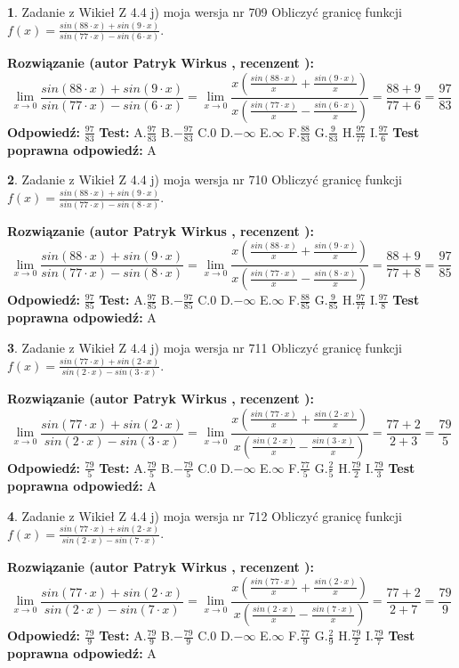 \documentclass[12pt, a4paper]{article}
\theoremstyle{definition} %
\newtheorem{zad}{}
\newcommand{\zadStart}[1]{\begin{zad}#1\newline}
\newcommand{\zadStop}{\end{zad}}
\newcommand{\rozwStart}[2]{\noindent \textbf{Rozwiązanie (autor #1 , recenzent #2): }\newline}
\newcommand{\rozwStop}{\newline}
\newcommand{\odpStart}{\noindent \textbf{Odpowiedź:}\newline}
\newcommand{\odpStop}{\newline}
\newcommand{\testStart}{\noindent \textbf{Test:}\newline}
\newcommand{\testStop}{\newline}
\newcommand{\kluczStart}{\noindent \textbf{Test poprawna odpowiedź:}\newline}
\newcommand{\kluczStop}{\newline}
\begin{document}
\zadStart{Zadanie z Wikieł Z 4.4 j) moja wersja nr 709}
Obliczyć granicę funkcji $f(x)=\frac{sin(88\cdot x) +sin(9\cdot x)}{sin(77\cdot x) -sin(6\cdot x)}$.
\zadStop
\rozwStart{Patryk Wirkus}{}
$$\lim\limits_{x\to 0}\frac{sin(88\cdot x) +sin(9\cdot x)}{sin(77\cdot x) -sin(6\cdot x)}=\lim\limits_{x\to 0}\frac{x(\frac{sin(88\cdot x)}{x}+\frac{sin(9\cdot x)}{x})}{x(\frac{sin(77\cdot x)}{x}-\frac{sin(6\cdot x)}{x})}=\frac{88+9}{77+6} = \frac{97}{83}$$
\rozwStop
\odpStart
$\frac{97}{83}$
\odpStop
\testStart
A.$\frac{97}{83}$
B.$-\frac{97}{83}$
C.$0$
D.$-\infty$
E.$\infty$
F.$\frac{88}{83}$
G.$\frac{9}{83}$
H.$\frac{97}{77}$
I.$\frac{97}{6}$
\testStop
\kluczStart
A
\kluczStop



\zadStart{Zadanie z Wikieł Z 4.4 j) moja wersja nr 710}
Obliczyć granicę funkcji $f(x)=\frac{sin(88\cdot x) +sin(9\cdot x)}{sin(77\cdot x) -sin(8\cdot x)}$.
\zadStop
\rozwStart{Patryk Wirkus}{}
$$\lim\limits_{x\to 0}\frac{sin(88\cdot x) +sin(9\cdot x)}{sin(77\cdot x) -sin(8\cdot x)}=\lim\limits_{x\to 0}\frac{x(\frac{sin(88\cdot x)}{x}+\frac{sin(9\cdot x)}{x})}{x(\frac{sin(77\cdot x)}{x}-\frac{sin(8\cdot x)}{x})}=\frac{88+9}{77+8} = \frac{97}{85}$$
\rozwStop
\odpStart
$\frac{97}{85}$
\odpStop
\testStart
A.$\frac{97}{85}$
B.$-\frac{97}{85}$
C.$0$
D.$-\infty$
E.$\infty$
F.$\frac{88}{85}$
G.$\frac{9}{85}$
H.$\frac{97}{77}$
I.$\frac{97}{8}$
\testStop
\kluczStart
A
\kluczStop



\zadStart{Zadanie z Wikieł Z 4.4 j) moja wersja nr 711}
Obliczyć granicę funkcji $f(x)=\frac{sin(77\cdot x) +sin(2\cdot x)}{sin(2\cdot x) -sin(3\cdot x)}$.
\zadStop
\rozwStart{Patryk Wirkus}{}
$$\lim\limits_{x\to 0}\frac{sin(77\cdot x) +sin(2\cdot x)}{sin(2\cdot x) -sin(3\cdot x)}=\lim\limits_{x\to 0}\frac{x(\frac{sin(77\cdot x)}{x}+\frac{sin(2\cdot x)}{x})}{x(\frac{sin(2\cdot x)}{x}-\frac{sin(3\cdot x)}{x})}=\frac{77+2}{2+3} = \frac{79}{5}$$
\rozwStop
\odpStart
$\frac{79}{5}$
\odpStop
\testStart
A.$\frac{79}{5}$
B.$-\frac{79}{5}$
C.$0$
D.$-\infty$
E.$\infty$
F.$\frac{77}{5}$
G.$\frac{2}{5}$
H.$\frac{79}{2}$
I.$\frac{79}{3}$
\testStop
\kluczStart
A
\kluczStop



\zadStart{Zadanie z Wikieł Z 4.4 j) moja wersja nr 712}
Obliczyć granicę funkcji $f(x)=\frac{sin(77\cdot x) +sin(2\cdot x)}{sin(2\cdot x) -sin(7\cdot x)}$.
\zadStop
\rozwStart{Patryk Wirkus}{}
$$\lim\limits_{x\to 0}\frac{sin(77\cdot x) +sin(2\cdot x)}{sin(2\cdot x) -sin(7\cdot x)}=\lim\limits_{x\to 0}\frac{x(\frac{sin(77\cdot x)}{x}+\frac{sin(2\cdot x)}{x})}{x(\frac{sin(2\cdot x)}{x}-\frac{sin(7\cdot x)}{x})}=\frac{77+2}{2+7} = \frac{79}{9}$$
\rozwStop
\odpStart
$\frac{79}{9}$
\odpStop
\testStart
A.$\frac{79}{9}$
B.$-\frac{79}{9}$
C.$0$
D.$-\infty$
E.$\infty$
F.$\frac{77}{9}$
G.$\frac{2}{9}$
H.$\frac{79}{2}$
I.$\frac{79}{7}$
\testStop
\kluczStart
A
\kluczStop
\end{document}
